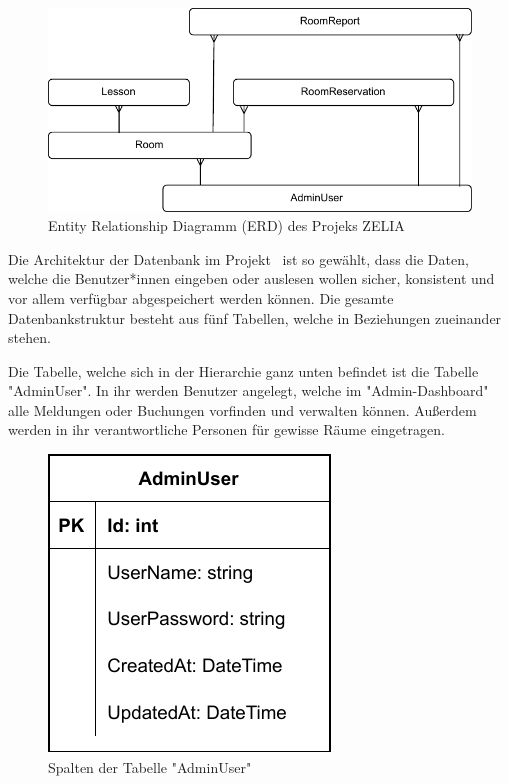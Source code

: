 
\begin{figure}[H]
    \centering
    \includegraphics{media/MariaDB/ERD.svg.pdf}
    \caption{Entity Relationship Diagramm (ERD) des Projeks ZELIA}
\end{figure}

Die Architektur der Datenbank im Projekt \ZELIA\ ist so gewählt, dass die Daten, welche die Benutzer*innen eingeben oder auslesen wollen sicher, konsistent und vor allem verfügbar abgespeichert werden können. Die gesamte Datenbankstruktur besteht aus fünf Tabellen, welche in Beziehungen zueinander stehen.


Die Tabelle, welche sich in der Hierarchie ganz unten befindet ist die Tabelle "AdminUser". In ihr werden Benutzer angelegt, welche im "Admin-Dashboard" alle Meldungen oder Buchungen vorfinden und verwalten können. Außerdem werden in ihr verantwortliche Personen für gewisse Räume eingetragen.

\begin{figure}[H]
    \centering
    \includegraphics{media/MariaDB/AdminUser.svg.pdf}
    \caption{Spalten der Tabelle "AdminUser"}
    \label{fig:AdminUserColls}
\end{figure}

